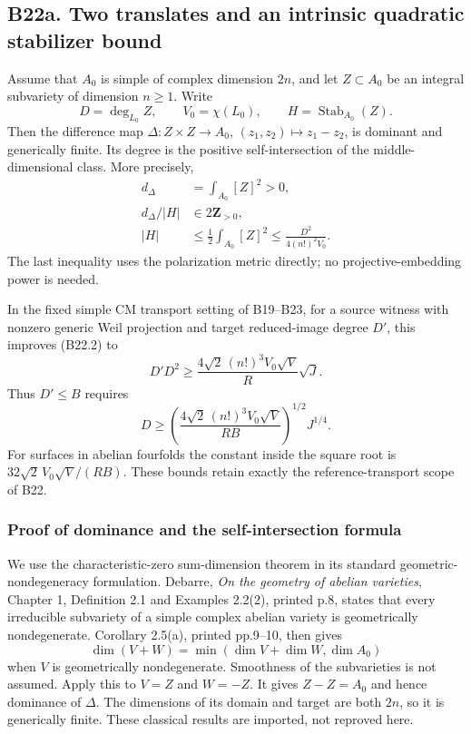 \documentclass[11pt,a4paper]{article}
\theoremstyle{definition}
\begin{document}
\subsection{B22a. Two translates and an intrinsic quadratic stabilizer bound}\label{b22a.-two-translates-and-an-intrinsic-quadratic-stabilizer-bound}

Assume that \(A_0\) is simple of complex dimension \(2n\), and let \(Z\subset A_0\) be an integral subvariety of dimension \(n\ge1\). Write \[
 D=\deg_{L_0}Z,\qquad V_0=\chi(L_0),\qquad H=\operatorname{Stab}_{A_0}(Z).
\] Then the difference map \(\Delta:Z\times Z\to A_0\), \((z_1,z_2)\mapsto z_1-z_2\), is dominant and generically finite. Its degree is the positive self-intersection of the middle-dimensional class. More precisely, \[
 \begin{aligned}
 d_\Delta&=\int_{A_0}[Z]^2>0,\\
 d_\Delta/|H|&\in2\mathbf Z_{>0},\\
 |H|&\le\frac12\int_{A_0}[Z]^2
 \le\frac{D^2}{4(n!)^2V_0}.
 \end{aligned}
\tag{B22a.1}
\] The last inequality uses the polarization metric directly; no projective-embedding power is needed.

In the fixed simple CM transport setting of B19--B23, for a source witness with nonzero generic Weil projection and target reduced-image degree \(D'\), this improves (B22.2) to \[
 D'D^2\ge
 \frac{4\sqrt2\,(n!)^3V_0\sqrt V}{R}\sqrt J.
\tag{B22a.2}
\] Thus \(D'\le B\) requires \[
 D\ge
 \left(\frac{4\sqrt2\,(n!)^3V_0\sqrt V}{RB}\right)^{1/2}J^{1/4}.
\tag{B22a.3}
\] For surfaces in abelian fourfolds the constant inside the square root is \(32\sqrt2\,V_0\sqrt V/(RB)\). These bounds retain exactly the reference-transport scope of B22.

\subsubsection{Proof of dominance and the self-intersection formula}\label{proof-of-dominance-and-the-self-intersection-formula}

We use the characteristic-zero sum-dimension theorem in its standard geometric-nondegeneracy formulation. Debarre, \emph{On the geometry of abelian varieties}, Chapter 1, Definition 2.1 and Examples 2.2(2), printed p.8, states that every irreducible subvariety of a simple complex abelian variety is geometrically nondegenerate. Corollary 2.5(a), printed pp.9--10, then gives \[
 \dim(V+W)=\min(\dim V+\dim W,\dim A_0)
\] when \(V\) is geometrically nondegenerate. Smoothness of the subvarieties is not assumed. Apply this to \(V=Z\) and \(W=-Z\). It gives \(Z-Z=A_0\) and hence dominance of \(\Delta\). The dimensions of its domain and target are both \(2n\), so it is generically finite. These classical results are imported, not reproved here.
\end{document}
